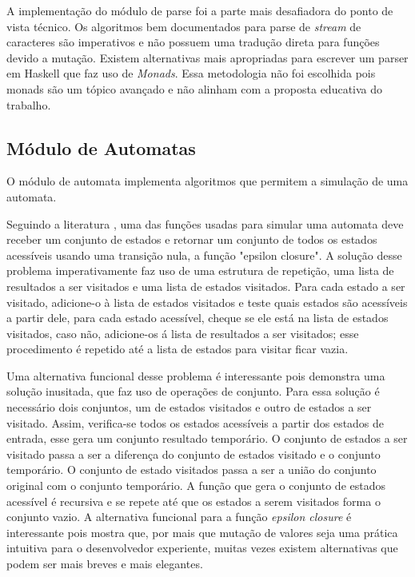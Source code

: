 A implementação do módulo de parse foi a parte mais desafiadora do ponto de vista técnico.
Os algoritmos bem documentados para parse de \emph{stream} de caracteres são imperativos e não possuem uma tradução direta para funções devido a mutação.
Existem alternativas mais apropriadas para escrever um parser em Haskell que faz uso de \emph{Monads}.
Essa metodologia não foi escolhida pois monads são um tópico avançado e não alinham com a proposta educativa do trabalho.

\subsection{Módulo de Automatas}
O módulo de automata implementa algoritmos que permitem a simulação de uma automata.

Seguindo a literatura \cite{dragon-book}, uma das funções usadas para simular uma automata deve receber um conjunto de estados e retornar um conjunto de todos os estados acessíveis usando uma transição nula, a função "epsilon closure".
A solução desse problema imperativamente faz uso de uma estrutura de repetição, uma lista de resultados a ser visitados e uma lista de estados visitados.
Para cada estado a ser visitado, adicione-o à lista de estados visitados e teste quais estados são acessíveis a partir dele, para cada estado acessível, cheque se ele está na lista de estados visitados, caso não, adicione-os á lista de resultados a ser visitados; esse procedimento é repetido até a lista de estados para visitar ficar vazia.

Uma alternativa funcional desse problema é interessante pois demonstra uma solução inusitada, que faz uso de operações de conjunto.
Para essa solução é necessário dois conjuntos, um de estados visitados e outro de estados a ser visitado.
Assim, verifica-se todos os estados acessíveis a partir dos estados de entrada, esse gera um conjunto resultado temporário.
O conjunto de estados a ser visitado passa a ser a diferença do conjunto de estados visitado e o conjunto temporário.
O conjunto de estado visitados passa a ser a união do conjunto original com o conjunto temporário.
A função que gera o conjunto de estados acessível é recursiva e se repete até que os estados a serem visitados forma o conjunto vazio.
A alternativa funcional para a função \emph{epsilon closure} é interessante pois mostra que, por mais que mutação de valores seja uma prática intuitiva para o desenvolvedor experiente, muitas vezes existem alternativas que podem ser mais breves e mais elegantes.

